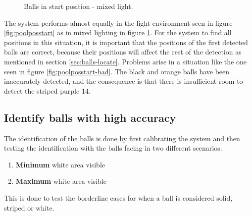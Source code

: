 \begin{figure}[H]
  \centering
\quad
\quad
   \caption{Balls in start position - mixed light.}
  \label{fig:poolposstart2}
\end{figure}

The system performs almost equally in the light environment seen in figure \ref{fig:poolposstart} as in mixed lighting in figure \ref{fig:poolposstart2}. For the system to find all positions in this situation, it is important that the positions of the first detected balls are correct, because their positions will affect the rest of the detection as mentioned in section \ref{sec:balls-locate}. Problems arise in a situation like the one seen in figure \ref{fig:poolposstart-bad}. The black and orange balls have been inaccurately detected, and the consequence is that there is insufficient room to detect the striped purple 14.


\subsection{Identify balls with high accuracy}
The identification of the balls is done by first calibrating the system and then testing the identification with the balls facing in two different scenarios:

\begin{enumerate}
\setlength{\itemsep}{0mm}
	\item \textbf{Minimum} white area visible
	\item \textbf{Maximum} white area visible
\end{enumerate}
This is done to test the borderline cases for when a ball is considered solid, striped or white.

